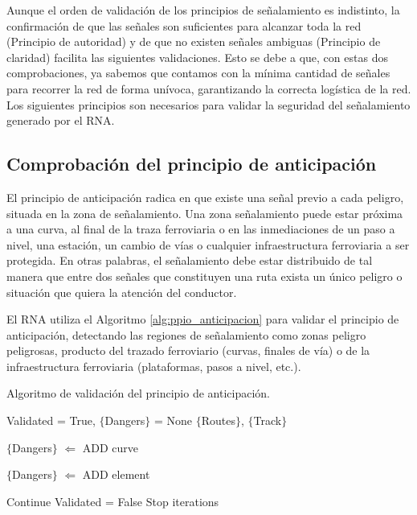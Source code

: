 		Aunque el orden de validación de los principios de señalamiento es indistinto, la confirmación de que las señales son suficientes para alcanzar toda la red (Principio de autoridad) y de que no existen señales ambiguas (Principio de claridad) facilita las siguientes validaciones. Esto se debe a que, con estas dos comprobaciones, ya sabemos que contamos con la mínima cantidad de señales para recorrer la red de forma unívoca, garantizando la correcta logística de la red. Los siguientes principios son necesarios para validar la seguridad del señalamiento generado por el RNA.
		
	\subsection{Comprobación del principio de anticipación}
		
		El principio de anticipación radica en que existe una señal previo a cada peligro, situada en la zona de señalamiento. Una zona señalamiento puede estar próxima a una curva, al final de la traza ferroviaria o en las inmediaciones de un paso a nivel, una estación, un cambio de vías o cualquier infraestructura ferroviaria a ser protegida. En otras palabras, el señalamiento debe estar distribuido de tal manera que entre dos señales que constituyen una ruta exista un único peligro o situación que quiera la atención del conductor.
		
		El RNA utiliza el Algoritmo \ref{alg:ppio_anticipacion} para validar el principio de anticipación, detectando las regiones de señalamiento como zonas peligro peligrosas, producto del trazado ferroviario (curvas, finales de vía) o de la infraestructura ferroviaria (plataformas, pasos a nivel, etc.). 
		
		\begin{algorithm}[H]
			\caption{Algoritmo de validación del principio de anticipación.}\label{alg:ppio_anticipacion}
			\DontPrintSemicolon
			\SetNoFillComment
			\LinesNotNumbered 
			Validated = True, $\{$Dangers$\}$ = None\;
			$\{$Routes$\}$, $\{$Track$\}$\; 
		
			
			{
				$\{$Dangers$\}$ $\Leftarrow$ ADD curve
			}
			
			{
				$\{$Dangers$\}$ $\Leftarrow$ ADD element
			}
			
			{
				
				{
					{
						Continue\;
					}
					\Else
					{
						Validated = False\; 
						Stop iterations\;
					}
				}	
			}
			
		\end{algorithm}
		
